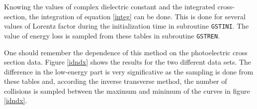 Knowing the values of complex dielectric constant and the integrated
cross-section, the integration of equation \ref{integ} can
be done. This is done for several values of Lorentz factor
during the initialization time in  subroutine {\tt GSTINI}.
The value of energy loss is sampled from these tables in
subroutine {\tt GSTREN}.

One should remember the dependence of this method on the
photoelectric cross section data.
Figure \ref{idndx} shows the results for the two different
data sets. The difference in the low-energy part is very
significative as the sampling is done from these tables
and, according the inverse transverse method, the number of
collisions is sampled between the maximum and minimum
of the curves in figure \ref{idndx}.








